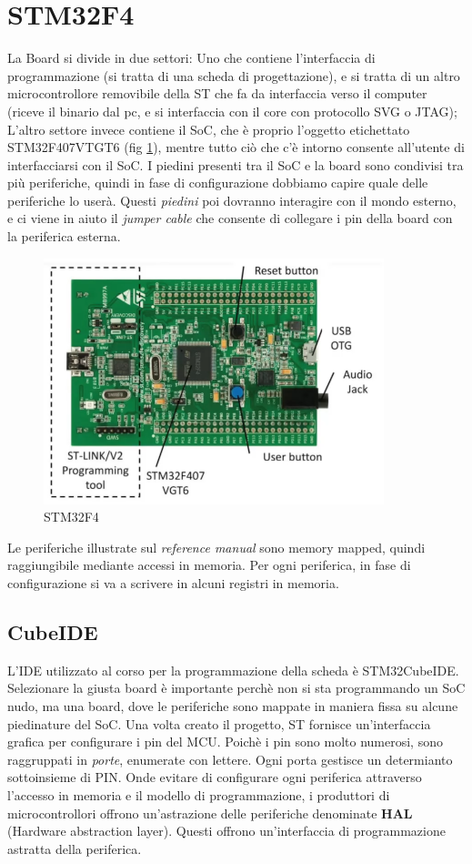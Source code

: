 \section{STM32F4}
La Board si divide in due settori: Uno che contiene l'interfaccia di programmazione (si tratta di una scheda di progettazione), e si tratta di un altro microcontrollore removibile della ST che fa da interfaccia verso il computer (riceve il binario dal pc, e si interfaccia con il core con protocollo SVG o JTAG); L'altro settore invece contiene il SoC, che è proprio l'oggetto etichettato STM32F407VTGT6 (fig \ref{img:STM32F4}), mentre tutto ciò che c'è intorno consente all'utente di interfacciarsi con il SoC. 
I piedini presenti tra il SoC e la board sono condivisi tra più periferiche, quindi in fase di configurazione dobbiamo capire quale delle periferiche lo userà. Questi \textit{piedini} poi dovranno interagire con il mondo esterno, e ci viene in aiuto il \textit{jumper cable} che consente di collegare i pin della board con la periferica esterna.


\begin{figure}[h!]
    \centering
    \includegraphics[width=.7\textwidth]{img/STM32F4.png}
    \caption{STM32F4}
    \label{img:STM32F4}
\end{figure}


Le periferiche illustrate sul \textit{reference manual} sono memory mapped, quindi raggiungibile mediante accessi in memoria. Per ogni periferica, in fase di configurazione si va a scrivere in alcuni registri in memoria. 

\subsection{CubeIDE}
L'IDE utilizzato al corso per la programmazione della scheda è STM32CubeIDE.
Selezionare la giusta board è importante perchè non si sta programmando un SoC nudo, ma una board, dove le periferiche sono mappate in maniera fissa su alcune piedinature del SoC. 
Una volta creato il progetto, ST fornisce un'interfaccia grafica per configurare i pin del MCU. 
Poichè i pin sono molto numerosi, sono raggruppati in \textit{porte}, enumerate con lettere. Ogni porta gestisce un determianto sottoinsieme di PIN. 
Onde evitare di configurare ogni periferica attraverso l'accesso in memoria e il modello di programmazione, i produttori di microcontrollori offrono un'astrazione delle periferiche denominate \textbf{HAL} (Hardware abstraction layer). Questi offrono un'interfaccia di programmazione astratta della periferica. 

